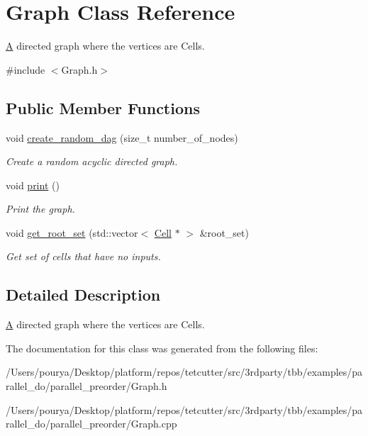 \hypertarget{classGraph}{}\section{Graph Class Reference}
\label{classGraph}


\hyperlink{structA}{A} directed graph where the vertices are Cells.  




{\ttfamily \#include $<$Graph.\+h$>$}

\subsection*{Public Member Functions}
\begin{DoxyCompactItemize}
\item 
\hypertarget{classGraph_a21bf06f0903a0d252e176e5f1a3682d1}{}void \hyperlink{classGraph_a21bf06f0903a0d252e176e5f1a3682d1}{create\+\_\+random\+\_\+dag} (size\+\_\+t number\+\_\+of\+\_\+nodes)\label{classGraph_a21bf06f0903a0d252e176e5f1a3682d1}

\begin{DoxyCompactList}\small\item\em Create a random acyclic directed graph. \end{DoxyCompactList}\item 
\hypertarget{classGraph_a2ecf3dd3c4897aa924da8e5c221a8509}{}void \hyperlink{classGraph_a2ecf3dd3c4897aa924da8e5c221a8509}{print} ()\label{classGraph_a2ecf3dd3c4897aa924da8e5c221a8509}

\begin{DoxyCompactList}\small\item\em Print the graph. \end{DoxyCompactList}\item 
\hypertarget{classGraph_a666056d01457c22fa121149db6f81583}{}void \hyperlink{classGraph_a666056d01457c22fa121149db6f81583}{get\+\_\+root\+\_\+set} (std\+::vector$<$ \hyperlink{classCell}{Cell} $\ast$ $>$ \&root\+\_\+set)\label{classGraph_a666056d01457c22fa121149db6f81583}

\begin{DoxyCompactList}\small\item\em Get set of cells that have no inputs. \end{DoxyCompactList}\end{DoxyCompactItemize}


\subsection{Detailed Description}
\hyperlink{structA}{A} directed graph where the vertices are Cells. 

The documentation for this class was generated from the following files\+:\begin{DoxyCompactItemize}
\item 
/\+Users/pourya/\+Desktop/platform/repos/tetcutter/src/3rdparty/tbb/examples/parallel\+\_\+do/parallel\+\_\+preorder/Graph.\+h\item 
/\+Users/pourya/\+Desktop/platform/repos/tetcutter/src/3rdparty/tbb/examples/parallel\+\_\+do/parallel\+\_\+preorder/Graph.\+cpp\end{DoxyCompactItemize}
